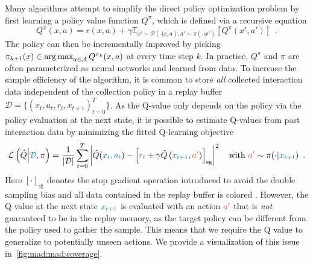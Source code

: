 Many algorithms attempt to simplify the direct policy optimization problem by first learning a policy value function $Q^\pi$, which is defined via a recursive equation%
\begin{equation*}
Q^\pi(x,a) = r(x,a) + \gamma \mathbb{E}_{x' \sim \mathcal{P}(\cdot|x,a), a' \sim \pi(\cdot|x')}\left[Q^\pi(x',a')\right]\enspace.    
\end{equation*}
The policy can then be incrementally improved by picking 
$\pi_{k+1}(x) \in \operatorname*{arg\,max}_{a \in \mathcal{A}} Q^{\pi_k}(x,a)\label{eq:mad:pi_update}$
at every time step $k$.
In practice, $Q^\pi$ and $\pi$ are often parameterized as neural networks and learned from data. 
To increase the sample efficiency of the algorithm, it is common to store \textit{all} collected interaction data independent of the collection policy in a replay buffer $\mathcal{D} = \{(x_t, a_t, r_t, x_{t+1})_{t=0}^{T}\}$.
As the Q-value only depends on the policy via the policy evaluation at the next state, it is possible to estimate Q-values from past interaction data by minimizing the fitted Q-learning objective 
\begin{align}
\mathcal{L}\left(\hat{Q}\middle|\blue{\mathcal{D}}, \pi\right) = \frac{1}{|\mathcal{D}|} \sum_{t=0}^T \left| \hat{Q}(\blue{x_t,a_t}) - \left[\blue{r_t} + \gamma \hat{Q}\left(\blue{x_{t+1}}, \red{a'}\right)\right]_\mathrm{sg} \right|^2\quad \mathrm{with }~\red{a'}\sim \pi(\cdot|\blue{x_{t+1}}) \enspace. \label{eq:mad:off_policy_q_update}
\end{align}
Here $[\cdot]_\mathrm{sg}$ denotes the stop gradient operation introduced to avoid the double sampling bias and all data contained in the replay buffer is colored . 
However, the Q value at the next state $\blue{x_{t+1}}$ is evaluated with an action $\red{a'}$ that is \emph{not} guaranteed to be in the replay memory, as the target policy can be different from the policy used to gather the sample.
This means that we require the Q value to generalize to potentially unseen actions.
We provide a visualization of this issue in~\autoref{fig:mad:mad:coverage}.

